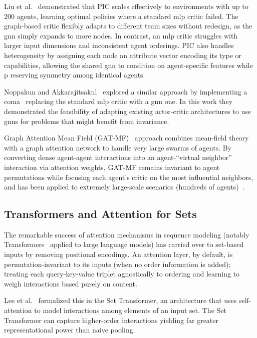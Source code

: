 \documentclass{article}
\begin{document}
Liu et al.~\cite{liu2020b} demonstrated that PIC scales effectively 
to environments with up to 200 agents, learning optimal policies where 
a standard \gls{mlp} critic failed. The graph-based critic flexibly adapts to 
different team sizes without redesign, as the \gls{gnn} simply expands to more nodes. 
In contrast, an \gls{mlp} critic struggles with larger input dimensions 
and inconsistent agent orderings. PIC also handles heterogeneity by 
assigning each node an attribute vector encoding its type or capabilities, 
allowing the shared \gls{gnn} to condition on agent-specific features while p
reserving symmetry among identical agents.

Noppakun and Akkarajitsakul~\cite{noppakun2022} explored a similar
approach by implementing a \gls{coma}~\cite{foerster2018}
replacing the standard \gls{mlp} critic with a \gls{gnn} one.
In this work they demonstrated the feasibility of adapting
existing actor-critic architectures to use \glspl{gnn}
for problems that might benefit from invariance.

Graph Attention Mean Field (GAT-MF)~\cite{hao2023} approach combines mean-field 
theory with a graph attention network to handle very large swarms of agents. 
By converting dense agent-agent interactions into an agent-“virtual neighbor” 
interaction via attention weights, GAT-MF remains invariant to agent permutations 
while focusing each agent's critic on the most influential neighbors, 
and has been applied to extremely large-scale scenarios (hundreds of agents)~\cite{hao2022}.


\subsection{Transformers and Attention for Sets}

The remarkable success of attention mechanisms in sequence modeling 
(notably Transformers~\cite{vaswani2017} applied to large language models) 
has carried over to set-based inputs by removing positional encodings. 
An attention layer, by default, is permutation-invariant to its inputs 
(when no order information is added); treating each query-key-value triplet 
agnostically to ordering and learning to weigh interactions based purely on content. 

Lee et al.~\cite{lee2019} 
formalized this in the Set Transformer, an architecture that uses 
self-attention to model interactions among elements of an input set. 
The Set Transformer can capture higher-order interactions
yielding far greater representational power than naive pooling. 
\end{document}
